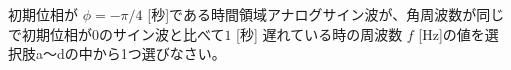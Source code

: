 初期位相が $\phi=-\pi/4$ [秒]である時間領域アナログサイン波が、角周波数が同じで初期位相が$0$のサイン波と比べて$1$ [秒] 遅れている時の周波数 $f$ [Hz]の値を選択肢a〜dの中から1つ選びなさい。
